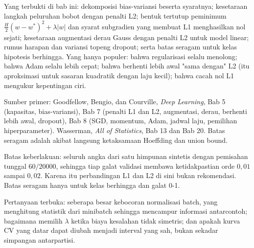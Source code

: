 \begin{untukpeneliti}
Yang terbukti di bab ini: dekomposisi bias-variansi beserta syaratnya; kesetaraan
langkah peluruhan bobot dengan penalti L2; bentuk tertutup peminimum
$\frac H2(w-w^\ast)^2+\lambda|w|$ dan syarat subgradien yang membuat L1 menghasilkan nol
sejati; kesetaraan augmentasi derau Gauss dengan penalti L2 untuk model linear; rumus
harapan dan variansi topeng dropout; serta batas seragam untuk kelas hipotesis
berhingga. Yang hanya populer: bahwa regularisasi selalu menolong; bahwa Adam selalu
lebih cepat; bahwa berhenti lebih awal "sama dengan" L2 (itu aproksimasi untuk sasaran
kuadratik dengan laju kecil); bahwa cacah nol L1 mengukur kepentingan ciri.

Sumber primer: Goodfellow, Bengio, dan Courville, \emph{Deep Learning}, Bab 5
(kapasitas, bias-variansi), Bab 7 (penalti L1 dan L2, augmentasi, derau, berhenti lebih
awal, dropout), Bab 8 (SGD, momentum, Adam, jadwal laju, pemilihan hiperparameter).
Wasserman, \emph{All of Statistics}, Bab 13 dan Bab 20. Batas seragam adalah akibat
langsung ketaksamaan Hoeffding dan union bound.

Batas keberlakuan: seluruh angka dari satu himpunan sintetis dengan pemisahan tunggal
$60/20000$, sehingga tiap galat validasi membawa ketidakpastian orde $0{,}01$ sampai
$0{,}02$. Karena itu perbandingan L1 dan L2 di sini bukan rekomendasi. Batas seragam hanya
untuk kelas berhingga dan galat 0-1.

Pertanyaan terbuka: seberapa besar kebocoran normalisasi batch, yang menghitung
statistik dari minibatch sehingga mencampur informasi antarcontoh; bagaimana memilih
$\lambda$ ketika biaya kesalahan tidak simetris; dan apakah kurva CV yang datar dapat
diubah menjadi interval yang sah, bukan sekadar simpangan antarpartisi.
\end{untukpeneliti}

